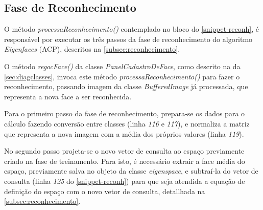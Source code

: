 \codigoJava



\subsection{Fase de Reconhecimento}\label{sec:implrecog}

O método \textit{processaReconhecimento()} contemplado no bloco do \autoref{snippet-reconh}, é responsável por executar os três passos da fase de reconhecimento do algoritmo \textit{Eigenfaces} (ACP), descritos na \autoref{subsec:reconhecimento}.



\codigoJava



O método \textit{regocFace()} da classe \textit{PanelCadastroDeFace}, como descrito na da \autoref{sec:diagclasses}, invoca este método \textit{processaReconhecimento()} para fazer o reconhecimento, passando imagem da classe \textit{BufferedImage} já processada, que representa a nova face a ser reconhecida. 

Para o primeiro passo da fase de reconhecimento, prepara-se os dados para o cálculo fazendo conversão entre classes (linha \textit{116} e \textit{117}), e normaliza a matriz que representa a nova imagem com a média dos próprios valores (linha \textit{119}).

No segundo passo projeta-se o novo vetor de consulta ao espaço previamente criado na fase de treinamento. Para isto, é necessário extrair a face média do espaço, previamente salva no objeto da classe \textit{eigenspace}, e subtraí-la do vetor de consulta (linha \textit{125} do \autoref{snippet-reconh}) para que seja atendida a equação de definição do espaço com o novo vetor de consulta, detallhada  na \autoref{subsec:reconhecimento}. 

